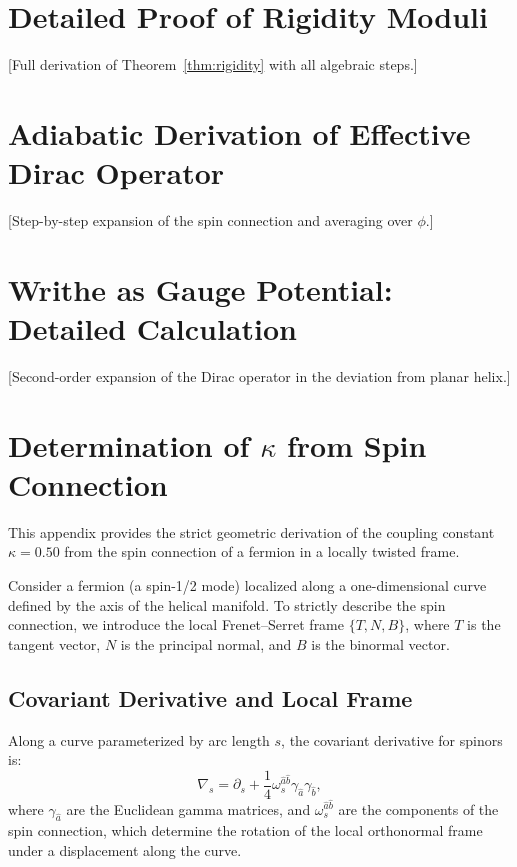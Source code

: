 \documentclass[12pt, a4paper]{article}
\theoremstyle{definition}
\begin{document}
\appendix
\section{Detailed Proof of Rigidity Moduli}
\label{app:rigidity-proof}
[Full derivation of Theorem~\ref{thm:rigidity} with all algebraic steps.]

\section{Adiabatic Derivation of Effective Dirac Operator}
\label{app:adiabatic-derivation}
[Step-by-step expansion of the spin connection and averaging over $\phi$.]

\section{Writhe as Gauge Potential: Detailed Calculation}
\label{app:writhe-derivation}
[Second-order expansion of the Dirac operator in the deviation from planar helix.]

\section{Determination of $\kappa$ from Spin Connection}
\label{app:kappa-calculation}

This appendix provides the strict geometric derivation of the coupling constant $\kappa = 0.50$ from the spin connection of a fermion in a locally twisted frame. 

Consider a fermion (a spin-1/2 mode) localized along a one-dimensional curve defined by the axis of the helical manifold. To strictly describe the spin connection, we introduce the local Frenet--Serret frame $\{T, N, B\}$, where $T$ is the tangent vector, $N$ is the principal normal, and $B$ is the binormal vector.

\subsection{Covariant Derivative and Local Frame}
Along a curve parameterized by arc length $s$, the covariant derivative for spinors is:
\begin{equation}
\nabla_s = \partial_s + \frac{1}{4} \omega_s^{\hat{a}\hat{b}} \gamma_{\hat{a}} \gamma_{\hat{b}},
\end{equation}
where $\gamma_{\hat{a}}$ are the Euclidean gamma matrices, and $\omega_s^{\hat{a}\hat{b}}$ are the components of the spin connection, which determine the rotation of the local orthonormal frame under a displacement along the curve.
\end{document}

